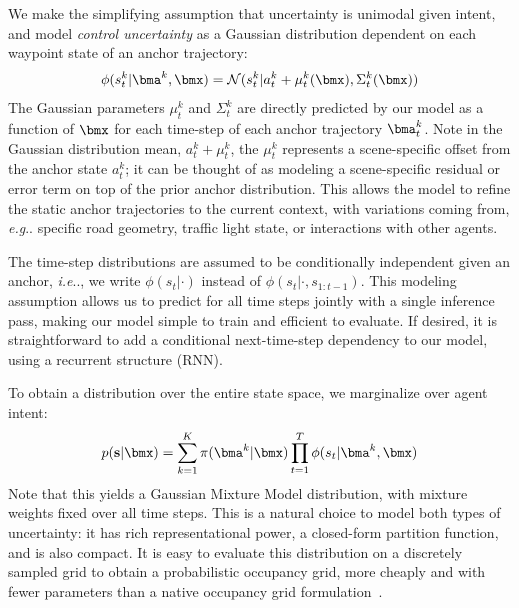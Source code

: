 \documentclass{article}
\makeatletter
\DeclareRobustCommand\onedot{\futurelet\@let@token\@onedot}
\def\@onedot{\ifx\@let@token.\else.\null\fi\xspace}
\def\eg{\emph{e.g}\onedot} \def\Eg{\emph{E.g}\onedot}
\def\ie{\emph{i.e}\onedot} \def\Ie{\emph{I.e}\onedot}
\makeatother
\begin{document}
We make the simplifying assumption that uncertainty is unimodal given intent, and model {\em control uncertainty} as a Gaussian distribution dependent on each waypoint state of an anchor trajectory:
\begin{align} 
\phi(s^k_t | \bma^k, \bmx) = \mathcal{N}(s^k_t | a^k_t + \mu^k_t(\bmx), \Sigma^k_t(\bmx))
\end{align}
The Gaussian parameters $\mu^k_t$ and $\Sigma^k_t$ are directly predicted by our model as a function of $\bmx$ for each time-step of each anchor trajectory $\bma^k_t$.  Note in the Gaussian distribution mean, $a^k_t + \mu^k_t$, the $\mu^k_t$ represents a scene-specific offset from the anchor state $a^k_t$; it can be thought of as modeling a scene-specific residual or error term on top of the prior anchor distribution. This allows the model to refine the static anchor trajectories to the current context, with variations coming from, \eg specific road geometry, traffic light state, or interactions with other agents.

The time-step distributions are assumed to be conditionally independent given an anchor, \ie, we write $\phi(s_t|\cdot)$ instead of $\phi(s_t|\cdot, s_{1:t-1})$. This modeling assumption allows us to predict for all time steps jointly with a single inference pass, making our model simple to train and efficient to evaluate. If desired, it is straightforward to add a conditional next-time-step dependency to our model, using a recurrent structure (RNN).

To obtain a distribution over the entire state space, we marginalize over agent intent:
\begin{align}
\label{eq:multiflow-likelihood}
    p(\mathbf{s} | \bmx) =  \sum_{k=1}^K \pi(\bma^k | \bmx) \prod_{t=1}^T  \phi(s_t | \bma^k, \bmx)
\end{align}
Note that this yields a Gaussian Mixture Model distribution, with mixture weights fixed over all time steps. This is a natural choice to model both types of uncertainty: it has rich representational power, a closed-form partition function, and is also compact.  It is easy to evaluate this distribution on a discretely sampled grid to obtain a probabilistic occupancy grid, more cheaply and with fewer parameters than a native occupancy grid formulation~\cite{Hong19, Bansal19}. 
\end{document}
